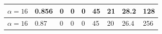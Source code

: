 \documentclass{article}
\begin{document}
\begin{center}
\begin{table}[hbt!]
\begin{tabular}{|c|l|l|l|l|l|l|l|l|}
{ $\alpha = 16$}       & { 0.856}                                        & { 0}                                    & { 0}                                    & { 0}                                    & { 45}                                  & { 21 }                               & { 28.2 }                                 & { 128}                                      \\ \hline
{ $\alpha = 16$}       & { 0.87}                                         & { 0}                                    & { 0}                                    & { 0}                                    & { 45}                                  & { 20 }                               & { 26.4 }                                 & { 256}                                      \\ \hline
\end{tabular}
\end{table}
\end{center}
\end{document}
